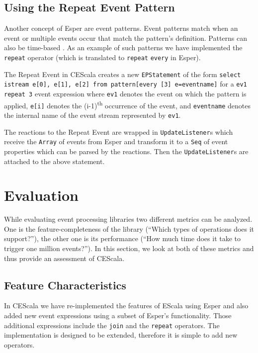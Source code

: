 \documentclass[book,type=bsc,colorback,accentcolor=tud8b,12pt,twoside]{tudthesis}
\begin{document}
\section{Using the Repeat Event Pattern}
\label{sec:repeat-pattern}

Another concept of Esper are event patterns.  Event patterns match when an event or multiple events occur that match the pattern's definition. Patterns can also be time-based \cite{Esper}.  As an example of such patterns we have implemented the \mbox{\texttt{repeat}} operator (which is translated to \mbox{\texttt{repeat}} \mbox{\texttt{every}} in Esper).  

The Repeat Event in CEScala creates a new \mbox{\texttt{EPStatement}} of the form
\texttt{select istream e[0], e[1], e[2] from pattern[every [3] e=eventname]} for a \mbox{\texttt{ev1 repeat 3}} event expression where \mbox{\texttt{ev1}} denotes the event on which the pattern is applied, \mbox{\texttt{e[i]}} denotes the (i-1)\textsuperscript{th} occurrence of the event, and \mbox{\texttt{eventname}} denotes the internal name of the event stream represented by \mbox{\texttt{ev1}}.  

The reactions to the Repeat Event are wrapped in \mbox{\texttt{UpdateListener}}s which receive the \mbox{\texttt{Array}} of events from Esper and transform it to a \mbox{\texttt{Seq}} of event properties which can be parsed by the reactions.  Then the \mbox{\texttt{UpdateListener}}s are attached to the above statement.  

\chapter{Evaluation}
\label{sec:evaluation}

While evaluating event processing libraries two different metrics can be analyzed.  One is the feature-completeness of the library (``Which types of operations does it support?''), the other one is its performance (``How much time does it take to trigger one million events?'').  In this section, we look at both of these metrics and thus provide an assessment of CEScala.

\section{Feature Characteristics}
\label{sec:feat-compl}

In CEScala we have re-implemented the features of EScala using Esper and also added new event expressions using a subset of Esper's functionality.  Those additional expressions include the \mbox{\texttt{join}} and the \mbox{\texttt{repeat}} operators.  The implementation is designed to be extended, therefore it is simple to add new operators.  
\end{document}
